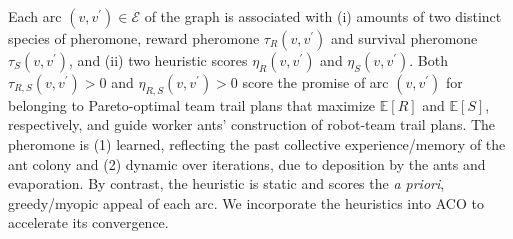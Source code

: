 \documentclass[fleqn,10pt,lineno]{wlpeerj}
\begin{document}
Each arc $(v, v^\prime)\in\mathcal{E}$ of the graph is associated with 
(i) amounts of two distinct species of pheromone, reward pheromone $\tau_R(v, v^\prime)$ and survival pheromone $\tau_S(v, v^\prime)$, and 
(ii) two heuristic scores $\eta_R(v, v^\prime)$ and $\eta_S(v, v^\prime)$.
Both $\tau_{R,S}(v, v^\prime)>0$ and $\eta_{R,S}(v, v^\prime)>0$ score the promise of arc $(v, v^\prime)$ for belonging to Pareto-optimal team trail plans that maximize $\mathbb{E}[R]$ and $\mathbb{E}[S]$, respectively, and guide worker ants' construction of robot-team trail plans.
The pheromone is (1) learned, reflecting the past collective experience/memory of the ant colony and (2) dynamic over iterations, due to deposition by the ants and evaporation.
By contrast, the heuristic is static and scores the \emph{a priori}, greedy/myopic appeal of each arc.
We incorporate the heuristics into ACO to accelerate its convergence.
%
%
%
\end{document}
